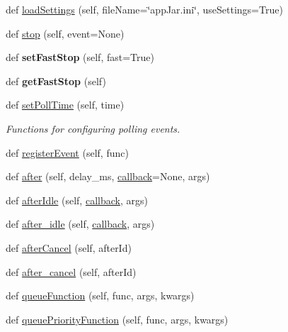 \begin{DoxyCompactItemize}
def \hyperlink{classappjar_1_1gui_af2ee0abe3052301e3cbde9889d539e26}{load\+Settings} (self, file\+Name=\char`\"{}app\+Jar.\+ini\char`\"{}, use\+Settings=True)
\item 
def \hyperlink{classappjar_1_1gui_a28ff5fbc0aa77aacf692082a00af676b}{stop} (self, event=None)
\item 
\mbox{\label{classappjar_1_1gui_a1e8b0d22aa7ed2285f1f7232e3d82e75}} 
def {\bfseries set\+Fast\+Stop} (self, fast=True)
\item 
\mbox{\label{classappjar_1_1gui_ad1d49c31adff695fb3f031a2e9c166be}} 
def {\bfseries get\+Fast\+Stop} (self)
\item 
def \hyperlink{classappjar_1_1gui_ad7e63c228283684446ad2f4090898863}{set\+Poll\+Time} (self, time)
\begin{DoxyCompactList}\small\item\em Functions for configuring polling events. \end{DoxyCompactList}\item 
def \hyperlink{classappjar_1_1gui_aaa7ebd8bcd4da761727153007b3b13f2}{register\+Event} (self, func)
\item 
def \hyperlink{classappjar_1_1gui_a1fde7d8815e07abdeec5f885eebf3080}{after} (self, delay\+\_\+ms, \hyperlink{classappjar_1_1gui_a2a2f2b7b9c196be3449f4490fe73ee8d}{callback}=None, args)
\item 
def \hyperlink{classappjar_1_1gui_a2591b3c63bf3e015db40f14ef62c8b1a}{after\+Idle} (self, \hyperlink{classappjar_1_1gui_a2a2f2b7b9c196be3449f4490fe73ee8d}{callback}, args)
\item 
def \hyperlink{classappjar_1_1gui_ac77f7de243bdc2768c5e6bb4ed27c6fe}{after\+\_\+idle} (self, \hyperlink{classappjar_1_1gui_a2a2f2b7b9c196be3449f4490fe73ee8d}{callback}, args)
\item 
def \hyperlink{classappjar_1_1gui_adfcc77d386733b2a33fbddfad831f336}{after\+Cancel} (self, after\+Id)
\item 
def \hyperlink{classappjar_1_1gui_a9868fb4807bcf042789c84d29ab47d0f}{after\+\_\+cancel} (self, after\+Id)
\item 
def \hyperlink{classappjar_1_1gui_a4e49b2e9ac6a35cb037ddf685a28692e}{queue\+Function} (self, func, args, kwargs)
\item 
def \hyperlink{classappjar_1_1gui_aed55cb246e9cf47f4763d72bb46b5266}{queue\+Priority\+Function} (self, func, args, kwargs)
\item 

\end{DoxyCompactItemize}

